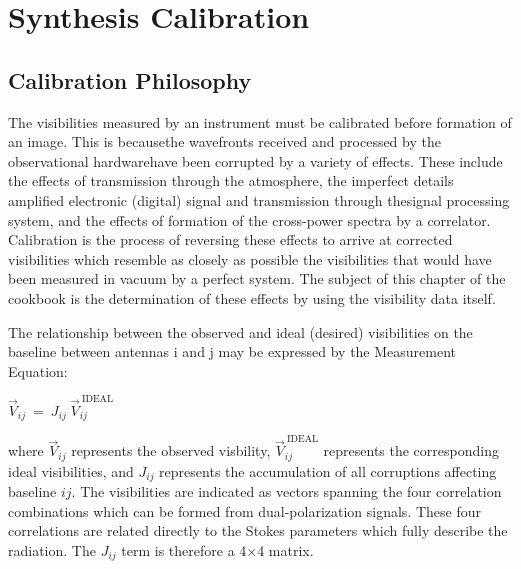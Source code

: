 

\chapter{Synthesis Calibration}
\label{chapter:caltool}

\section{Calibration Philosophy}
\label{section:caltool.intro}

The visibilities measured by an instrument must be calibrated before
formation of an image. This is becausethe wavefronts received and
processed by the observational hardwarehave been corrupted by a
variety of effects. These include the effects of transmission through
the atmosphere, the imperfect details amplified electronic (digital)
signal and transmission through thesignal processing system, and the
effects of formation of the cross-power spectra by a
correlator. Calibration is the process of reversing these effects to
arrive at corrected visibilities which resemble as closely as possible
the visibilities that would have been measured in vacuum by a perfect
system. The subject of this chapter of the cookbook is the
determination of these effects by using the visibility data itself. 

The relationship between the observed and ideal (desired) visibilities
on the baseline between antennas i and j may be expressed by the
Measurement Equation: 

$\vec{V}_{ij}~=~J_{ij}~\vec{V}_{ij}^{\mathrm{~IDEAL}}$

where $\vec{V}_{ij}$ represents the observed visbility,
$\vec{V}_{ij}^{\mathrm{~IDEAL}}$ represents the corresponding ideal
visibilities, and $J_{ij}$ represents the accumulation of all
corruptions affecting baseline $ij$. The visibilities are indicated as
vectors spanning the four correlation combinations which can be formed
from dual-polarization signals. These four correlations are related
directly to the Stokes parameters which fully describe the
radiation. The $J_{ij}$ term is therefore a 4$\times$4 matrix. 

